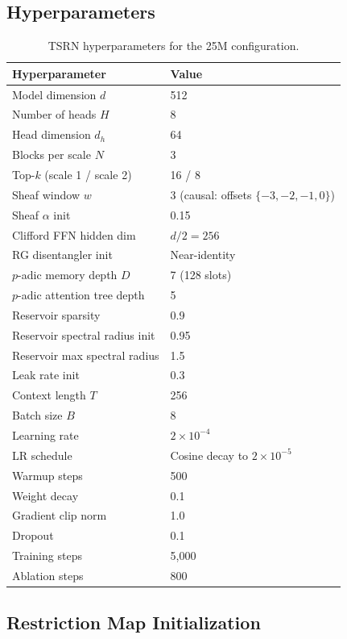 \documentclass[11pt,a4paper]{article}
\begin{document}
\subsection{Hyperparameters}

\begin{table}[h]
\centering
\caption{TSRN hyperparameters for the 25M configuration.}
\label{tab:hparams}
\begin{tabular}{ll}
\toprule
\textbf{Hyperparameter} & \textbf{Value} \\
\midrule
Model dimension $d$ & 512 \\
Number of heads $H$ & 8 \\
Head dimension $d_h$ & 64 \\
Blocks per scale $N$ & 3 \\
Top-$k$ (scale 1 / scale 2) & 16 / 8 \\
Sheaf window $w$ & 3 (causal: offsets $\{-3,-2,-1,0\}$) \\
Sheaf $\alpha$ init & 0.15 \\
Clifford FFN hidden dim & $d/2 = 256$ \\
RG disentangler init & Near-identity \\
$p$-adic memory depth $D$ & 7 (128 slots) \\
$p$-adic attention tree depth & 5 \\
Reservoir sparsity & 0.9 \\
Reservoir spectral radius init & 0.95 \\
Reservoir max spectral radius & 1.5 \\
Leak rate init & 0.3 \\
\midrule
Context length $T$ & 256 \\
Batch size $B$ & 8 \\
Learning rate & $2 \times 10^{-4}$ \\
LR schedule & Cosine decay to $2 \times 10^{-5}$ \\
Warmup steps & 500 \\
Weight decay & 0.1 \\
Gradient clip norm & 1.0 \\
Dropout & 0.1 \\
Training steps & 5{,}000 \\
Ablation steps & 800 \\
\bottomrule
\end{tabular}
\end{table}

\subsection{Restriction Map Initialization}
\end{document}
